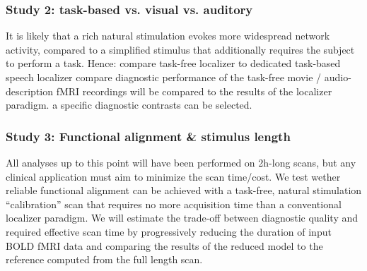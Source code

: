 \subsubsection{Study 2: task-based vs. visual vs. auditory}
%
It is likely that a rich natural stimulation evokes more widespread
network activity, compared to a simplified stimulus that additionally requires
the subject to perform a task.
%
Hence: compare task-free localizer to dedicated task-based speech localizer
%
compare diagnostic performance of the task-free movie / audio-description fMRI
recordings will be compared to the results of the localizer paradigm.
%
a specific diagnostic contrasts can be selected.

\subsubsection{Study 3: Functional alignment \& stimulus length}
%
All analyses up to this point will have been performed on 2h-long
scans, but any clinical application must aim to minimize the scan time/cost.
%
We test wether reliable functional alignment can be achieved with a task-free,
natural stimulation ``calibration” scan that requires no more acquisition time
than a conventional localizer paradigm.
%
We will estimate the trade-off between diagnostic quality
and required effective scan time by progressively reducing the duration of input
BOLD fMRI data and comparing the results of the reduced model to the reference
computed from the full length scan.


